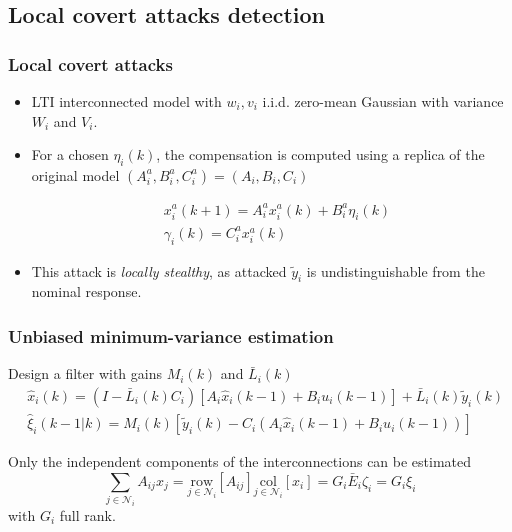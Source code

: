 \documentclass[presentation]{beamer}
\newcommand{\NN}{{\mathcal{N}}}
\newcommand{\col}[1]{\underset{{#1}}{\mathrm{col}}}
\newcommand{\row}[1]{\underset{{#1}}{\mathrm{row}}}
\begin{document}
\subsection{Local covert attacks detection}

\begin{frame}
	\frametitle{Local covert attacks}

	\begin{itemize}
		\setlength{\itemsep}{2ex}
		\item<1-> LTI interconnected model with $w_i, v_i$ i.i.d. zero-mean Gaussian with variance $W_i$ and $V_i$.
		
		\item<2-> For a chosen $\eta_i(k)$, the compensation is computed using a replica of the original model $(A_i^a, B_i^a, C_i^a) = (A_i,B_i,C_i)$
		
		\begin{equation*}
			\begin{aligned}
				&x^{a}_i(k+1) = A^a_i x^a_i(k) + B^a_i \eta_i(k) \\
				&\gamma_i(k) = C^a_i x^a_i(k) \,
			\end{aligned}
		\end{equation*}

		\item<3> This attack is \emph{locally stealthy}, as attacked $\tilde y_i$ is undistinguishable from the nominal response.
	\end{itemize}
\end{frame}

\begin{frame}
	\frametitle{Unbiased minimum-variance estimation}
	Design a filter with gains $M_i(k)$ and $\bar L_i(k)$
	\begin{align*}
		&\hat{x}_i(k) =  (I - \bar L_i(k)C_i)\left[A_i\hat{x}_i(k-1) + B_i u_i(k-1)\right] +\bar L_i(k) \tilde y_i(k) \\
		&\hat{\xi}_i(k-1|k) = M_i(k)\left[\tilde{y}_i(k) - C_i \left(A_i\hat{x}_i(k-1) + B_i u_i(k-1)	\right) \right]
	\end{align*}
	
	\vfill
	Only the independent components of the interconnections can be estimated
	$$
		\sum_{j\in\mathcal{N}_i}A_{ij} x_j = \row{j\in\NN_i}\left[A_{ij}\right]\col{j\in\NN_i}\left[x_i\right] = G_i \bar{E}_i \zeta_i = G_i \xi_i
	$$
	with $G_i$ full rank.
\end{frame}
\end{document}
